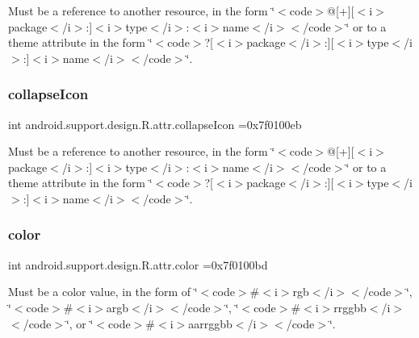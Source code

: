 Must be a reference to another resource, in the form \char`\"{}$<$code$>$@\mbox{[}+\mbox{]}\mbox{[}$<$i$>$package$<$/i$>$\+:\mbox{]}$<$i$>$type$<$/i$>$\+:$<$i$>$name$<$/i$>$$<$/code$>$\char`\"{} or to a theme attribute in the form \char`\"{}$<$code$>$?\mbox{[}$<$i$>$package$<$/i$>$\+:\mbox{]}\mbox{[}$<$i$>$type$<$/i$>$\+:\mbox{]}$<$i$>$name$<$/i$>$$<$/code$>$\char`\"{}. \mbox{\label{classandroid_1_1support_1_1design_1_1R_1_1attr_ab780800888c8f742b7139b48235b7ff7}} 
\subsubsection{\texorpdfstring{collapse\+Icon}{collapseIcon}}
{\footnotesize\ttfamily int android.\+support.\+design.\+R.\+attr.\+collapse\+Icon =0x7f0100eb\hspace{0.3cm}{\ttfamily [static]}}

Must be a reference to another resource, in the form \char`\"{}$<$code$>$@\mbox{[}+\mbox{]}\mbox{[}$<$i$>$package$<$/i$>$\+:\mbox{]}$<$i$>$type$<$/i$>$\+:$<$i$>$name$<$/i$>$$<$/code$>$\char`\"{} or to a theme attribute in the form \char`\"{}$<$code$>$?\mbox{[}$<$i$>$package$<$/i$>$\+:\mbox{]}\mbox{[}$<$i$>$type$<$/i$>$\+:\mbox{]}$<$i$>$name$<$/i$>$$<$/code$>$\char`\"{}. \mbox{\label{classandroid_1_1support_1_1design_1_1R_1_1attr_ac4692721eae257ed767bb464917446de}} 
\subsubsection{\texorpdfstring{color}{color}}
{\footnotesize\ttfamily int android.\+support.\+design.\+R.\+attr.\+color =0x7f0100bd\hspace{0.3cm}{\ttfamily [static]}}

Must be a color value, in the form of \char`\"{}$<$code$>$\#$<$i$>$rgb$<$/i$>$$<$/code$>$\char`\"{}, \char`\"{}$<$code$>$\#$<$i$>$argb$<$/i$>$$<$/code$>$\char`\"{}, \char`\"{}$<$code$>$\#$<$i$>$rrggbb$<$/i$>$$<$/code$>$\char`\"{}, or \char`\"{}$<$code$>$\#$<$i$>$aarrggbb$<$/i$>$$<$/code$>$\char`\"{}. 

